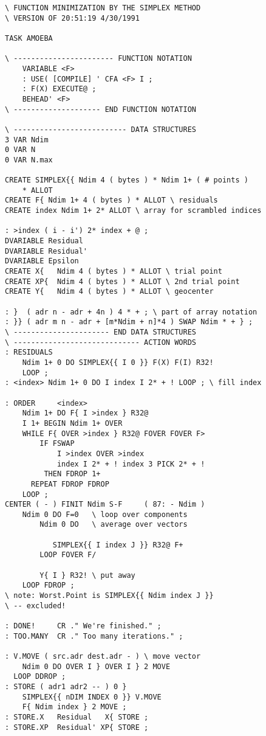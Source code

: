 \begin{lstlisting}
\ FUNCTION MINIMIZATION BY THE SIMPLEX METHOD
\ VERSION OF 20:51:19 4/30/1991

TASK AMOEBA

\ ----------------------- FUNCTION NOTATION
    VARIABLE <F>
    : USE( [COMPILE] ' CFA <F> I ;
    : F(X) EXECUTE@ ;
    BEHEAD' <F>
\ -------------------- END FUNCTION NOTATION

\ -------------------------- DATA STRUCTURES
3 VAR Ndim
0 VAR N
0 VAR N.max

CREATE SIMPLEX{{ Ndim 4 ( bytes ) * Ndim 1+ ( # points )
    * ALLOT
CREATE F{ Ndim 1+ 4 ( bytes ) * ALLOT \ residuals
CREATE index Ndim 1+ 2* ALLOT \ array for scrambled indices

: >index ( i - i') 2* index + @ ;
DVARIABLE Residual
DVARIABLE Residual'
DVARIABLE Epsilon
CREATE X{   Ndim 4 ( bytes ) * ALLOT \ trial point
CREATE XP{  Ndim 4 ( bytes ) * ALLOT \ 2nd trial point
CREATE Y{   Ndim 4 ( bytes ) * ALLOT \ geocenter

: }  ( adr n - adr + 4n ) 4 * + ; \ part of array notation
: }} ( adr m n - adr + [m*Ndim + n]*4 ) SWAP Ndim * + } ;
\ ---------------------- END DATA STRUCTURES
\ ----------------------------- ACTION WORDS
: RESIDUALS
    Ndim 1+ 0 DO SIMPLEX{{ I 0 }} F(X) F(I) R32!
    LOOP ;
: <index> Ndim 1+ 0 DO I index I 2* + ! LOOP ; \ fill index

: ORDER     <index>
    Ndim 1+ DO F{ I >index } R32@
    I 1+ BEGIN Ndim 1+ OVER
    WHILE F{ OVER >index } R32@ FOVER FOVER F>
        IF FSWAP
            I >index OVER >index
            index I 2* + ! index 3 PICK 2* + !
         THEN FDROP 1+
      REPEAT FDROP FDROP
    LOOP ;
CENTER ( - ) FINIT Ndim S-F     ( 87: - Ndim )
    Ndim 0 DO F=0   \ loop over components
        Ndim 0 DO   \ average over vectors
        
           SIMPLEX{{ I index J }} R32@ F+
        LOOP FOVER F/

        Y{ I } R32! \ put away
    LOOP FDROP ;
\ note: Worst.Point is SIMPLEX{{ Ndim index J }}
\ -- excluded!

: DONE!     CR ." We're finished." ;
: TOO.MANY  CR ." Too many iterations." ;

: V.MOVE ( src.adr dest.adr - ) \ move vector
    Ndim 0 DO OVER I } OVER I } 2 MOVE
  LOOP DDROP ;
: STORE ( adr1 adr2 -- ) 0 }
    SIMPLEX{{ nDIM INDEX 0 }} V.MOVE
    F{ Ndim index } 2 MOVE ;
: STORE.X   Residual   X{ STORE ;
: STORE.XP  Residual' XP{ STORE ;


\end{lstlisting}
